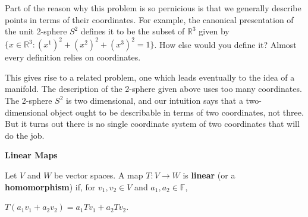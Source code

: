 \documentclass[12pt, a4paper]{article}
\begin{document}
    Part of the reason why this problem is so pernicious is that we generally describe points in terms of their coordinates. For example, the canonical presentation of the unit 2-sphere $S^2$ defines it to be the subset of $\mathbb{R}^3$ given by $\{x\in\mathbb{R}^3\colon (x^1)^2+(x^2)^2+(x^3)^2=1\}$. How else would you define it? Almost every definition relies on coordinates.\par
    
\begin{flushleft}

    This gives rise to a related problem, one which leads eventually to the idea of a manifold. The description of the 2-sphere given above uses too many coordinates. The 2-sphere $S^2$ is two dimensional, and our intuition says that a two-dimensional object ought to be describable in terms of two coordinates, not three. But it turns out there is no single coordinate system of two coordinates that will do the job.

\end{flushleft}

\newpage

\begin{flushleft}
    \large{\textbf{Linear Maps}}\normalsize\par

\vspace{4mm}

    Let $V$ and $W$ be vector spaces. A map $T\colon V\rightarrow W$ is \textbf{linear} (or a \textbf{homomorphism}) if, for $v_1,v_2\in V$ and $a_1,a_2\in\mathbb{F}$,\par
    
\vspace{4mm}

        \centerline{$T(a_1v_1+a_2v_2)=a_1Tv_1+a_2Tv_2$.}
        
\vspace{4mm}

    

\end{flushleft}

\newpage
\end{document}
